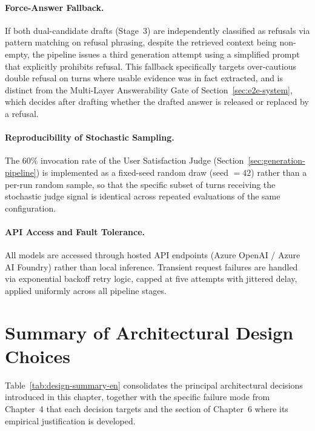 \paragraph{Force-Answer Fallback.} If both dual-candidate drafts (Stage~3) are independently classified as refusals via pattern matching on refusal phrasing, despite the retrieved context being non-empty, the pipeline issues a third generation attempt using a simplified prompt that explicitly prohibits refusal. This fallback specifically targets over-cautious double refusal on turns where usable evidence was in fact extracted, and is distinct from the Multi-Layer Answerability Gate of Section~\ref{sec:e2e-system}, which decides after drafting whether the drafted answer is released or replaced by a refusal.

\paragraph{Reproducibility of Stochastic Sampling.} The $60\%$ invocation rate of the User Satisfaction Judge (Section~\ref{sec:generation-pipeline}) is implemented as a fixed-seed random draw (seed $=42$) rather than a per-run random sample, so that the specific subset of turns receiving the stochastic judge signal is identical across repeated evaluations of the same configuration.

\paragraph{API Access and Fault Tolerance.} All models are accessed through hosted API endpoints (Azure OpenAI / Azure AI Foundry) rather than local inference. Transient request failures are handled via exponential backoff retry logic, capped at five attempts with jittered delay, applied uniformly across all pipeline stages.

\section{Summary of Architectural Design Choices}
\label{sec:arch-summary}

Table~\ref{tab:design-summary-en} consolidates the principal architectural decisions introduced in this chapter, together with the specific failure mode from Chapter~4 that each decision targets and the section of Chapter~6 where its empirical justification is developed.

